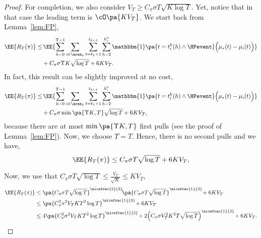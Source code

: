 \begin{proof}
For completion, we also consider $V_T \geq  C_\pi \sigma T\sqrt{ K\log{T}}$. Yet, notice that in that case the leading term is $\cO\pa{KV_T}$. We start back from Lemma~\ref{lem:FP},
\begin{align*}
\EE{R_T(\pi)} \leq &  \, \EE{\sum_{k=0}^{\Upsilon-1} \sum_{i\in\arms_k}\sum_{t=t_k +1 }^{t_{k+1}}\sum_{h=2}^{h^k_{i}}\mathbbm{1}\pa{ t = t_i^k(h) \land \HPevent} \Big(\mu_{\star}(t) - \mu_{i}(t)\Big)} \\
&+   C_\pi \sigma \Upsilon K\sqrt{\log{T}} + 6KV_T.
\end{align*}
In fact, this result can be slightly improved at no cost, 
\begin{align*}
\EE{R_T(\pi)} \leq &  \, \EE{\sum_{k=0}^{\Upsilon-1} \sum_{i\in\arms_k}\sum_{t=t_k +1 }^{t_{k+1}}\sum_{h=2}^{h^k_{i}}\mathbbm{1}\pa{ t = t_i^k(h) \land \HPevent} \Big(\mu_{\star}(t) - \mu_{i}(t)\Big)} \\
&+   C_\pi \sigma \min\pa{\Upsilon K, T}\sqrt{\log{T}} + 6KV_T,
\end{align*}
because there are at most $\min\pa{\Upsilon K, T}$ first pulls (see the proof of Lemma~\ref{lem:FP}). Now, we choose $\Upsilon = T$. Hence, there is no second pulls and we have,
\begin{equation*}
\EE{R_T(\pi)} \leq   C_\pi \sigma T\sqrt{\log{T}} + 6KV_T,
\end{equation*} 

Now, we use that $C_\pi \sigma T\sqrt{\log{T}} \leq \frac{V_T}{\sqrt{K}} \leq KV_T$,
\begin{align*}
\EE{R_T(\pi)} &\leq   \pa{C_\pi \sigma T\sqrt{\log{T}}}^{\nicefrac{2}{3}}\! \pa{C_\pi \sigma T\sqrt{\log{T}}}^{\nicefrac{1}{3}}\! + 6KV_T \\
& \leq  \pa{C_\pi^2 \sigma^2 V_T K T^2\log{T}}^{\nicefrac{1}{3}} \!+  6 KV_T\\
&\leq  4\pa{C_\pi^2 \sigma^2 V_T K T^2\log{T}}^{\nicefrac{1}{3}} \!+ 2\Big(C_\pi \sigma V_T^2  K^2  T \sqrt{\log{T}}\Big)^{\nicefrac{1}{3}} \!+ 6 K V_T.
\end{align*} 
\end{proof}

